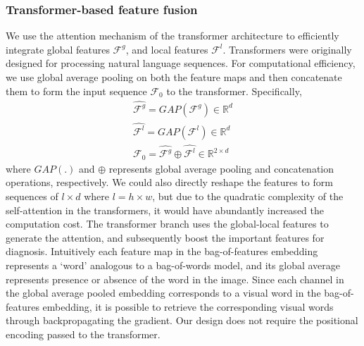 \documentclass[twocolumn,final]{elsarticle}
\begin{document}
\subsubsection{Transformer-based feature fusion}

We use the attention mechanism of the transformer architecture \citep{vaswani2017attention, dosovitskiy2020image} to efficiently integrate global features $\mathcal{F}^g$, and local features $\mathcal{F}^l$. Transformers were originally designed for processing natural language sequences. For computational efficiency, we use global average pooling on both the feature maps and then concatenate them to form the input sequence $\mathcal{F}_0$ to the transformer. Specifically, 
\begin{align}
    \hat{\mathcal{F}^g} = GAP(\mathcal{F}^g) \in \mathbb{R}^{d} \\
    \hat{\mathcal{F}^l} = GAP(\mathcal{F}^l) \in \mathbb{R}^{d} \\
    \mathcal{F}_0 = \hat{\mathcal{F}^g} \oplus \hat{\mathcal{F}^l} \in \mathbb{R}^{2\times d}
\end{align}
where $GAP(.)$ and $\oplus$ represents global average pooling and concatenation operations, respectively. We could also directly reshape the features to form sequences of $l \times d$ where $l=h \times w$, but due to the quadratic complexity of the self-attention in the transformers, it would have abundantly increased the computation cost. The transformer branch uses the global-local features to generate the attention, and subsequently boost the important features for diagnosis. Intuitively each feature map in the bag-of-features embedding represents a `word' analogous to a bag-of-words model, and its global average represents presence or absence of the word in the image. Since each channel in the global average pooled embedding corresponds to a visual word in the bag-of-features embedding, it is possible to retrieve the corresponding visual words through backpropagating the gradient. Our design does not require the positional encoding passed to the transformer.  
\end{document}
